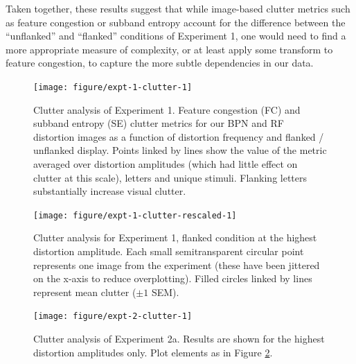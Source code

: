 \documentclass[doc, 11pt,a4paper,natbib]{apa6}\usepackage[]{graphicx}\usepackage[]{color}
\newenvironment{knitrout}{}{} %
\begin{document}
Taken together, these results suggest that while image-based clutter metrics such as feature congestion or subband entropy account for the difference between the ``unflanked'' and ``flanked'' conditions of Experiment 1, one would need to find a more appropriate measure of complexity, or at least apply some transform to feature congestion, to capture the more subtle dependencies in our data.






\begin{knitrout}
\color{fgcolor}\begin{figure}
\texttt{[image: figure/expt-1-clutter-1]} \caption[Clutter analysis of Experiment 1]{Clutter analysis of Experiment 1.
           Feature congestion (FC) and subband entropy (SE) clutter metrics for our BPN and RF distortion
images as a function of distortion frequency and flanked / unflanked display.
Points linked by lines show the value of the metric averaged over distortion amplitudes (which had little effect on
clutter at this scale), letters and unique stimuli.
Flanking letters substantially increase visual clutter.
             }\label{fig:expt-1-clutter}
\end{figure}


\end{knitrout}




\begin{knitrout}
\color{fgcolor}\begin{figure}
\texttt{[image: figure/expt-1-clutter-rescaled-1]} \caption[Clutter analysis for Experiment 1, flanked condition at the highest
distortion amplitude]{Clutter analysis for Experiment 1, flanked condition at the highest
distortion amplitude.
  Each small semitransparent circular point represents one image from the experiment (these have been jittered on the x-axis to reduce overplotting).
  Filled circles linked by lines represent mean clutter ($\pm 1$ SEM).
              }\label{fig:expt-1-clutter-rescaled}
\end{figure}


\end{knitrout}




\begin{knitrout}
\color{fgcolor}\begin{figure}
\texttt{[image: figure/expt-2-clutter-1]} \caption{Clutter analysis of Experiment 2a.
Results are shown for the highest distortion amplitudes only.
Plot elements as in Figure \ref{fig:expt-1-clutter-rescaled}.
}\label{fig:expt-2-clutter}
\end{figure}


\end{knitrout}
\end{document}
